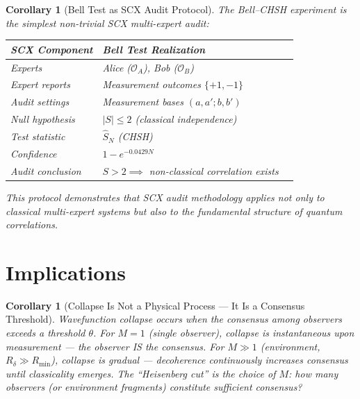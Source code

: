 \documentclass[11pt,a4paper]{article}
\newtheorem{corollary}[theorem]{Corollary}
\theoremstyle{definition}
\theoremstyle{remark}
\newcommand{\Obs}{\mathcal{O}}
\begin{document}
\begin{corollary}[Bell Test as SCX Audit Protocol]
The Bell--CHSH experiment is the simplest non-trivial SCX multi-expert audit:
\begin{center}
\begin{tabular}{@{}lll@{}}
\toprule
\textbf{SCX Component} & \textbf{Bell Test Realization} \\
\midrule
Experts               & Alice ($\Obs_A$), Bob ($\Obs_B$) \\
Expert reports        & Measurement outcomes $\{+1, -1\}$ \\
Audit settings         & Measurement bases $(a, a'; b, b')$ \\
Null hypothesis        & $|S| \leq 2$ (classical independence) \\
Test statistic         & $\hat{S}_N$ (CHSH) \\
Confidence             & $1 - e^{-0.0429 N}$ \\
Audit conclusion       & $S > 2 \implies$ non-classical correlation exists \\
\bottomrule
\end{tabular}
\end{center}
This protocol demonstrates that SCX audit methodology applies not only to classical multi-expert systems but also to the fundamental structure of quantum correlations.
\end{corollary}

\section{Implications}

\begin{corollary}[Collapse Is Not a Physical Process --- It Is a Consensus Threshold]
Wavefunction collapse occurs when the consensus among observers exceeds a threshold $\theta$. For $M=1$ (single observer), collapse is instantaneous upon measurement --- the observer IS the consensus. For $M \gg 1$ (environment, $R_\delta \gg R_{\min}$), collapse is gradual --- decoherence continuously increases consensus until classicality emerges. The ``Heisenberg cut'' is the choice of $M$: how many observers (or environment fragments) constitute sufficient consensus?
\end{corollary}
\end{document}
